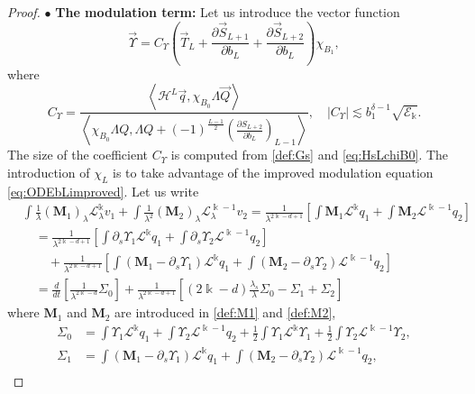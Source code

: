 \documentclass[11pt]{aims}
\theoremstyle{definition}
\numberwithin{equation}{section}
\begin{document}
\begin{proof}
\noindent $\bullet$ \textbf{The modulation term:} Let us introduce the vector function
\begin{equation}\label{def:chiL}
\vec \Upsilon = C_\Upsilon \left( \vec{T}_L + \frac{\partial \vec{S}_{L + 1}}{\partial b_L} + \frac{\partial \vec{S}_{L + 2}}{\partial b_L}\right)\chi_{B_1},
\end{equation}
where
\begin{equation}\label{def:CUp}
C_\Upsilon = \frac{\left< {\mathscr{H}}^L\vec q, \chi_{B_0}\Lambda \vec Q \right>}{\left<\chi_{B_0}\Lambda Q, \Lambda Q + (-1)^{\frac{L - 1} {2}} \left(\frac{\partial S_{L+2}}{\partial b_L}\right)_{L-1}\right>}, \quad |C_\Upsilon|\lesssim b_1^{\delta - 1}\sqrt{{\mathscr{E}}_\Bbbk}.
\end{equation}
The size of the coefficient $C_\Upsilon$ is computed from \eqref{def:Gs} and \eqref{eq:HsLchiB0}. The introduction of $\chi_L$ is to take advantage of the improved modulation equation \eqref{eq:ODEbLimproved}. Let us write 
\begin{align*}
&\int \frac{1}{\lambda}(\mathbf{M}_1)_\lambda {\mathscr{L}}^\Bbbk_\lambda v_1 + \int \frac{1}{\lambda^2}(\mathbf{M}_2)_\lambda {\mathscr{L}}^{\Bbbk-1}_\lambda v_2  = \frac{1}{\lambda^{2\Bbbk - d + 1}} \left[\int \mathbf{M}_1 {\mathscr{L}}^\Bbbk q_1 + \int \mathbf{M}_2 {\mathscr{L}}^{\Bbbk-1} q_2\right]\\
& \quad = \frac{1}{\lambda^{2\Bbbk - d + 1}} \left[\int {\partial_s} \Upsilon_1 {\mathscr{L}}^\Bbbk q_1 + \int {\partial_s} \Upsilon_2 {\mathscr{L}}^{\Bbbk-1} q_2\right] \\
& \qquad + \frac{1}{\lambda^{2\Bbbk - d + 1}} \left[\int \left(\mathbf{M}_1 - {\partial_s} \Upsilon_1\right) {\mathscr{L}}^\Bbbk q_1 + \int \left(\mathbf{M}_2 - {\partial_s} \Upsilon_2\right) {\mathscr{L}}^{\Bbbk-1} q_2\right]\\
& \quad = \frac{d}{dt} \left[\frac{1}{\lambda^{2\Bbbk - d}} \Sigma_0 \right] + \frac{1}{\lambda^{2\Bbbk - d + 1}}\left[(2\Bbbk - d)\frac{\lambda_s}{\lambda}\Sigma_0 - \Sigma_1 + \Sigma_2\right]
\end{align*}
where $\mathbf{M}_1$ and $\mathbf{M}_2$ are introduced in \eqref{def:M1} and \eqref{def:M2}, 
\begin{align*}
\Sigma_0 &=  \int \Upsilon_1 {\mathscr{L}}^\Bbbk q_1 + \int \Upsilon_2 {\mathscr{L}}^{\Bbbk-1} q_2  +\frac{1}{2}\int \Upsilon_1 {\mathscr{L}}^\Bbbk \Upsilon_1 + \frac{1}{2}\int \Upsilon_2 {\mathscr{L}}^{\Bbbk -1}\Upsilon_2,\\
\Sigma_1 &= \int \left(\mathbf{M}_1 - {\partial_s} \Upsilon_1\right) {\mathscr{L}}^\Bbbk q_1 + \int \left(\mathbf{M}_2 - {\partial_s} \Upsilon_2\right) {\mathscr{L}}^{\Bbbk-1} q_2,\\

\end{align*}
\end{proof}
\end{document}
